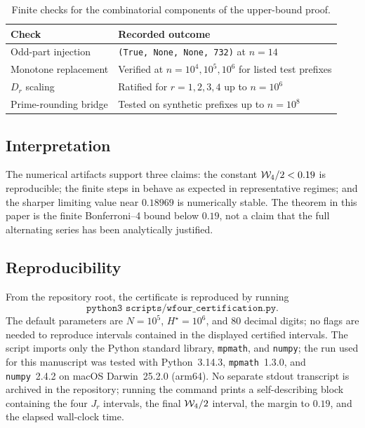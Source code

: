 \begin{table}[ht]
\centering
\small
\begin{tabular}{|l|l|}
\hline
Check & Recorded outcome \\
\hline
Odd-part injection & \texttt{(True, None, None, 732)} at $n=14$ \\
Monotone replacement & Verified at $n=10^4,10^5,10^6$ for listed test prefixes \\
$D_r$ scaling & Ratified for $r=1,2,3,4$ up to $n=10^6$ \\
Prime-rounding bridge & Tested on synthetic prefixes up to $n=10^8$ \\
\hline
\end{tabular}
\caption{Finite checks for the combinatorial components of the upper-bound proof.}
\label{tab:finite-checks}
\end{table}

\subsection{Interpretation}

The numerical artifacts support three claims: the constant $\mathcal{W}_4/2<0.19$ is
reproducible; the finite steps in  behave
as expected in representative regimes; and the sharper limiting value near
$0.18969$ is numerically stable.  The theorem in this paper is the finite
Bonferroni--4 bound below $0.19$, not a claim that the full alternating series
has been analytically justified.

\subsection{Reproducibility}

From the repository root, the certificate is reproduced by running
\[
  \texttt{python3 scripts/wfour\_certification.py}.
\]
The default parameters are $N=10^5$, $H^\star=10^6$, and $80$ decimal digits;
no flags are needed to reproduce intervals contained in the displayed
certified intervals.  The script imports only the Python standard library,
\texttt{mpmath}, and \texttt{numpy}; the run used for this manuscript was tested
with Python~3.14.3, \texttt{mpmath}~1.3.0, and \texttt{numpy}~2.4.2 on macOS
Darwin~25.2.0 (arm64).  No separate stdout transcript is archived in the
repository; running the command prints a self-describing block containing the
four $J_r$ intervals, the final $\mathcal{W}_4/2$ interval, the margin to $0.19$, and
the elapsed wall-clock time.
